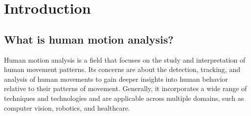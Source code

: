 \documentclass{l4proj}
\begin{document}
\tableofcontents

%
%
%
%
%
%
%
%
\chapter{Introduction}


\section{What is human motion analysis?}
Human motion analysis is a field that focuses on the study and interpretation of human movement patterns. Its concerns are about the detection, tracking, and analysis of human movements to gain deeper insights into human behavior relative to their patterns of movement. Generally, it incorporates a wide range of techniques and technologies and are applicable across multiple domains, such as computer vision, robotics, and healthcare.
\end{document}
